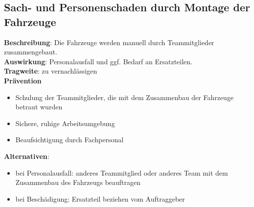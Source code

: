 \documentclass[a4paper, 12pt, titlepage]{scrartcl}
\begin{document}
	\subsection{Sach- und Personenschaden durch Montage der Fahrzeuge}
		\textbf{Beschreibung}: Die Fahrzeuge werden manuell durch Teammitglieder zusammengebaut.\\
		\textbf{Auswirkung}: Personalausfall und ggf. Bedarf an Ersatzteilen.\\
		\textbf{Tragweite}: zu vernachl\"assigen\\
		\textbf{Pr\"avention}
			\begin{itemize}
				\item Schulung der Teammitglieder, die mit dem Zusammenbau der Fahrzeuge betraut wurden
				\item Sichere, ruhige Arbeitsumgebung
				\item Beaufsichtigung durch Fachpersonal
			\end{itemize}
		\textbf{Alternativen}: 
			\begin{itemize}
				\item bei Personalausfall: anderes Teammitglied oder anderes Team mit dem Zusammenbau des Fahrzeugs beauftragen
				\item bei Besch\"adigung: Ersatzteil beziehen vom Auftraggeber
			\end{itemize}
		
\end{document}
